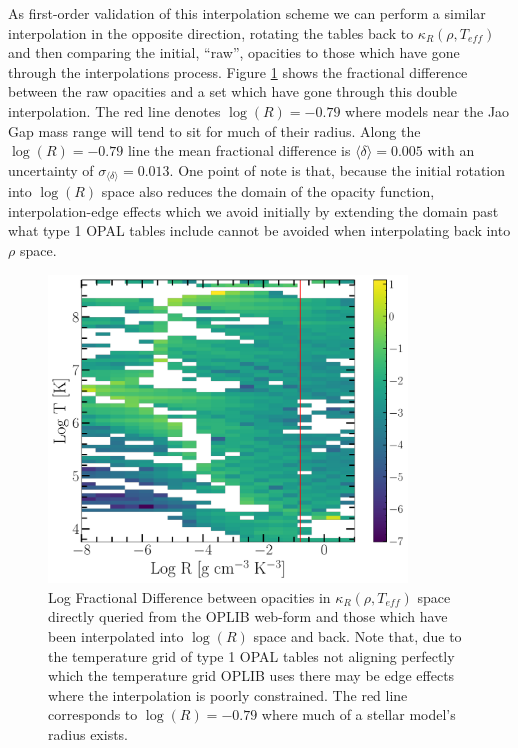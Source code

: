 As first-order validation of this interpolation scheme we can perform a similar
interpolation in the opposite direction, rotating the tables back to
$\kappa_{R}(\rho, T_{eff})$ and then comparing the initial, ``raw'', opacities
to those which have gone through the interpolations process. Figure
\ref{fig:fracdiff} shows the fractional difference between the raw opacities
and a set which have gone through this double interpolation. The red line
denotes $\log(R)=-0.79$ where models near the Jao Gap mass range will
tend to sit for much of their radius. Along the $\log(R)=-0.79$ line the mean
fractional difference is $\langle \delta \rangle = 0.005$ with an uncertainty of
$\sigma_{\langle\delta\rangle} = 0.013$. One point of note is that, because the
initial rotation into $\log(R)$ space also reduces the domain of the opacity
function, interpolation-edge effects which we avoid initially by extending the
domain past what type 1 OPAL tables include cannot be avoided when
interpolating back into $\rho$ space. 

\begin{figure}
	\centering
	\includegraphics[width=0.85\textwidth]{figures/jaoOpacity/FractionalDifference.pdf}
	\caption{Log Fractional Difference between opacities in $\kappa_{R}(\rho,
	T_{eff})$ space directly queried from the OPLIB web-form and those which
	have been interpolated into $\log(R)$ space and back. Note that, due to the
	temperature grid of type 1 OPAL tables not aligning perfectly which the temperature
	grid OPLIB uses there may be edge effects where the interpolation is poorly
	constrained. The red line corresponds to $\log(R) = -0.79$ where much of a
	stellar model's radius exists.}
	\label{fig:fracdiff}
\end{figure}

